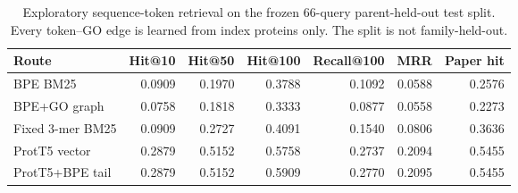 \documentclass[11pt]{article}
\begin{document}
\begin{table}[h]
\centering
\caption{Exploratory sequence-token retrieval on the frozen 66-query parent-held-out test split. Every token--GO edge is learned from index proteins only. The split is not family-held-out.}
\label{tab:token-retrieval}
\small
\begin{tabular}{lrrrrrr}
\toprule
Route & Hit@10 & Hit@50 & Hit@100 & Recall@100 & MRR & Paper hit \\
\midrule
BPE BM25 & 0.0909 & 0.1970 & 0.3788 & 0.1092 & 0.0588 & 0.2576 \\
BPE+GO graph & 0.0758 & 0.1818 & 0.3333 & 0.0877 & 0.0558 & 0.2273 \\
Fixed 3-mer BM25 & 0.0909 & 0.2727 & 0.4091 & 0.1540 & 0.0806 & 0.3636 \\
ProtT5 vector & 0.2879 & 0.5152 & 0.5758 & 0.2737 & 0.2094 & 0.5455 \\
ProtT5+BPE tail & 0.2879 & 0.5152 & 0.5909 & 0.2770 & 0.2095 & 0.5455 \\
\bottomrule
\end{tabular}
\end{table}

\begin{table}[h]
\centering
\caption{DRAG graph structure on 10k sequence-window graph views.}
\label{tab:drag-structure}
\end{table}
\end{document}
